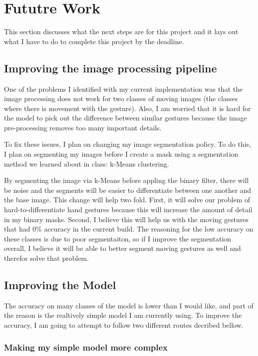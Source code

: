 \documentclass[9pt]{article}
\begin{document}
\section{Fututre Work}
This section discusses what the next steps are for this project and it lays out what I have to do to complete this project by the deadline.

\subsection{Improving the image processing pipeline}

One of the problems I identified with my current implementation was that the image processing does not work for two classes of moving images (the classes where there is movement with the gesture). Also, I am worried that it is hard for the model to pick out the difference between similar gestures because the image pre-processing removes too many important details.

To fix these issues, I plan on changing my image segmentation policy. To do this, I plan on segmenting my images before I create a mask using a segmentation method we learned about in class: k-Means clustering. 

By segmenting the image via k-Means before appling the binary filter, there will be noise and the segments will be easier to differentiate between one another and the base image. This change will help two fold. First, it will solve our problem of hard-to-differentiate hand gestures because this will increase the amount of detail in my binary masks. Second, I believe this will help us with the moving gestures that had 0\% accuracy in the current build. The reasoning for the low accuracy on these classes is due to poor segmentaiton, so if I improve the segmentation overall, I believe it will be able to better segment moving gestures as well and therefor solve that problem.

\subsection{Improving the Model}

The accuracy on many classes of the model is lower than I would like, and part of the reason is the realtively simple model I am currently using. To improve the accuracy, I am going to attempt to follow two different routes decribed bellow.

\subsubsection{Making my simple model more complex}
\end{document}
